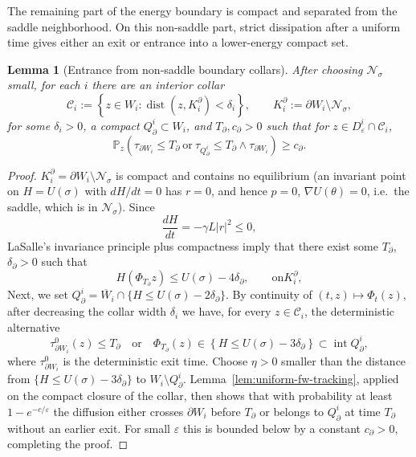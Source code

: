 \documentclass[11pt]{article}
\numberwithin{equation}{section}
\theoremstyle{plain}
\newtheorem{lemma}[theorem]{Lemma}
\theoremstyle{definition}
\theoremstyle{remark}
\newcommand{\eps}{\varepsilon}
\newcommand{\dist}{\operatorname{dist}}
\newcommand{\Pbb}{\mathbb P}
\begin{document}
The remaining part of the energy boundary is compact and separated from the
saddle neighborhood.  On this non-saddle part, strict dissipation after a
uniform time gives either an exit or entrance into a lower-energy compact
set.

\begin{lemma}[Entrance from non-saddle boundary collars]
\label{lem:original-nonsaddle-boundary-collar}
After choosing $\mathcal N_\sigma$ small, for each $i$ there are an interior
collar
\[
\mathcal C_i
:=\left\{z\in W_i:\dist\left(z,K_i^\partial\right)<\delta_i\right\},
\qquad
K_i^\partial:=\partial W_i\setminus\mathcal N_\sigma,
\]
for some $\delta_i>0$, a compact
$Q_\partial^i\subset W_i$, and $T_\partial,c_\partial>0$ such that for
$z\in D_\eps^i\cap\mathcal C_i$,
\[
\Pbb_z\left(\tau_{\partial W_i}\le T_\partial\ \text{or}\ \tau_{Q_\partial^i}\le T_\partial\wedge\tau_{\partial W_i}\right)\ge c_\partial.
\]
\end{lemma}

\begin{proof}
$K_i^\partial=\partial W_i\setminus\mathcal N_\sigma$ is compact and contains no
equilibrium (an invariant point on $H=U(\sigma)$ with $dH/dt=0$ has $r=0$, and hence
$p=0$, $\nabla U(\theta)=0$, i.e.\ the saddle, which is in $\mathcal N_\sigma$).
Since 
\[
\frac{dH}{dt}=-\gamma L|r|^2\le0, 
\]
LaSalle's invariance principle plus compactness imply that there exist some $T_\partial$,
$\delta_\partial>0$ such that 
\[
H(\Phi_{T_\partial}z)\le U(\sigma)-4\delta_\partial,
\qquad\text{on
$K_i^\partial$},
\]
Next, we set $Q_\partial^i=\overline W_i\cap\{H\le U(\sigma)-2\delta_\partial\}$.
By continuity of $(t,z)\mapsto\Phi_t(z)$, after decreasing the
collar width $\delta_i$ we have, for every $z\in\mathcal C_i$, the deterministic
alternative
\[
\tau_{\partial W_i}^{0}(z)\le T_\partial
\quad\text{or}\quad
\Phi_{T_\partial}(z)\in
\left\{H\le U(\sigma)-3\delta_\partial\right\}
\subset\operatorname{int}Q_\partial^i,
\]
where $\tau_{\partial W_i}^{0}$ is the deterministic exit time.  Choose
$\eta>0$ smaller than the distance from
$\{H\le U(\sigma)-3\delta_\partial\}$ to
$W_i\setminus Q_\partial^i$.  Lemma~\ref{lem:uniform-fw-tracking}, applied on
the compact closure of the collar, then shows that with probability at least
$1-e^{-c/\eps}$ the diffusion either crosses $\partial W_i$ before
$T_\partial$ or belongs to $Q_\partial^i$ at time $T_\partial$ without an
earlier exit.  For small $\eps$ this is bounded below by a constant
$c_\partial>0$, completing the proof.
\end{proof}
\end{document}
